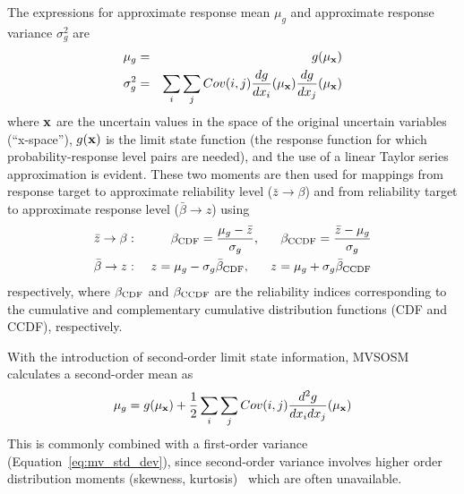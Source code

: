 The expressions for approximate response mean $\mu_g$ and approximate
response variance $\sigma^2_g$ are
\begin{eqnarray}
\mu_g      & = & g(\mu_{\bf x})  \label{eq:mv_mean1} \\
\sigma^2_g & = & \sum_i \sum_j Cov(i,j) \frac{dg}{dx_i}(\mu_{\bf x})
                 \frac{dg}{dx_j}(\mu_{\bf x}) \label{eq:mv_std_dev}
\end{eqnarray}
where ${\bf x}$ are the uncertain values in the 
space of the original uncertain variables (``x-space''), $g({\bf x})$
is the limit state function (the response function for which
probability-response level pairs are needed), and the use of a linear
Taylor series approximation is evident.
These two moments are then used for mappings from response target to
approximate reliability level ($\bar{z} \to \beta$) and from
reliability target to approximate response level
($\bar{\beta} \to z$) using
\begin{eqnarray}
\bar{z} \rightarrow \beta: & ~ & 
\beta_{\rm CDF} = \frac{\mu_g - \bar{z}}{\sigma_g}, ~~~~~
\beta_{\rm CCDF} = \frac{\bar{z} - \mu_g}{\sigma_g} \label{eq:mv_ria} \\
\bar{\beta} \rightarrow z: & ~ & 
z = \mu_g - \sigma_g \bar{\beta}_{\rm CDF}, ~~~~~
z = \mu_g + \sigma_g \bar{\beta}_{\rm CCDF} \label{eq:mv_pma}
\end{eqnarray}
respectively, where $\beta_{\rm CDF}$ and $\beta_{\rm CCDF}$ are the
reliability indices corresponding to the cumulative and complementary
cumulative distribution functions (CDF and CCDF), respectively.

With the introduction of second-order limit state information, MVSOSM
calculates a second-order mean as
\begin{equation}
\mu_g = g(\mu_{\bf x}) + \frac{1}{2} \sum_i \sum_j Cov(i,j) 
\frac{d^2g}{dx_i dx_j}(\mu_{\bf x}) \label{eq:mv_mean2}
\end{equation}
This is commonly combined with a first-order variance
(Equation~\ref{eq:mv_std_dev}), since second-order variance involves
higher order distribution moments (skewness, kurtosis)~\cite{Hal00}
which are often unavailable.

